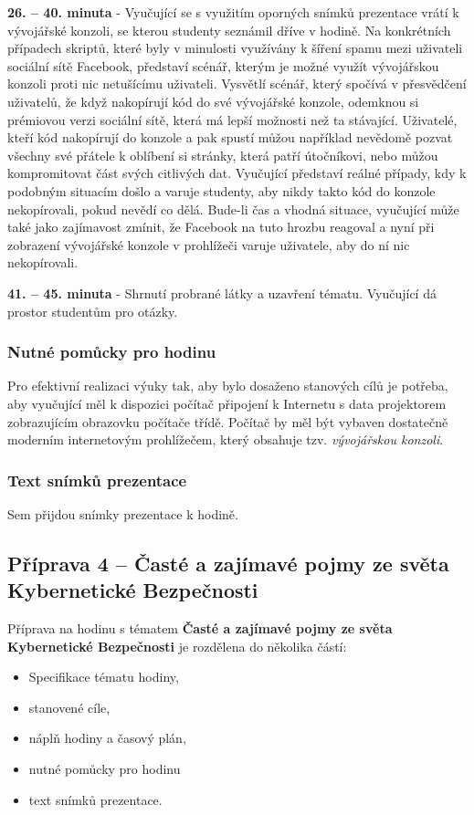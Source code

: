 \documentclass[a4paper, 12pt]{article}
\begin{document}
\textbf{26. -- 40. minuta} - Vyučující se s využitím oporných snímků prezentace vrátí k vývojářské konzoli, se kterou studenty seznámil dříve v hodině. Na konkrétních případech skriptů, které byly v minulosti využívány k šíření spamu mezi uživateli sociální sítě Facebook, představí scénář, kterým je možné využít vývojářskou konzoli proti nic netušícímu uživateli. Vysvětlí scénář, který spočívá v přesvědčení uživatelů, že když nakopírují kód do své vývojářské konzole, odemknou si prémiovou verzi sociální sítě, která má lepší možnosti než ta stávající. Uživatelé, kteří kód nakopírují do konzole a pak spustí můžou například nevědomě pozvat všechny své přátele k oblíbení si stránky, která patří útočníkovi, nebo můžou kompromitovat část svých citlivých dat. Vyučující představí reálné případy, kdy k podobným situacím došlo a varuje studenty, aby nikdy takto kód do konzole nekopírovali, pokud nevědí co dělá. Bude-li čas a vhodná situace, vyučující může také jako zajímavost zmínit, že Facebook na tuto hrozbu reagoval a nyní při zobrazení vývojářské konzole v prohlížeči varuje uživatele, aby do ní nic nekopírovali.

\textbf{41. -- 45. minuta} - Shrnutí probrané látky a uzavření tématu. Vyučující dá prostor studentům pro otázky.

\subsubsection{Nutné pomůcky pro hodinu}
Pro efektivní realizaci výuky tak, aby bylo dosaženo stanových cílů je potřeba, aby vyučující měl k dispozici počítač připojení k Internetu s data projektorem zobrazujícím obrazovku počítače třídě. Počítač by měl být vybaven dostatečně moderním internetovým prohlížečem, který obsahuje tzv. \textit{vývojářskou konzoli}.

\subsubsection{Text snímků prezentace}
Sem přijdou snímky prezentace k hodině.


\subsection{Příprava 4 -- Časté a zajímavé pojmy ze světa Kybernetické Bezpečnosti}
Příprava na hodinu s tématem \textbf{Časté a zajímavé pojmy ze světa Kybernetické Bezpečnosti} je rozdělena do několika částí:
\begin{itemize}
        \setlength{\itemsep}{-3pt}
        \item Specifikace tématu hodiny,
        \item stanovené cíle,
        \item náplň hodiny a časový plán,
        \item nutné pomůcky pro hodinu
        \item text snímků prezentace.
\end{itemize}
\end{document}
